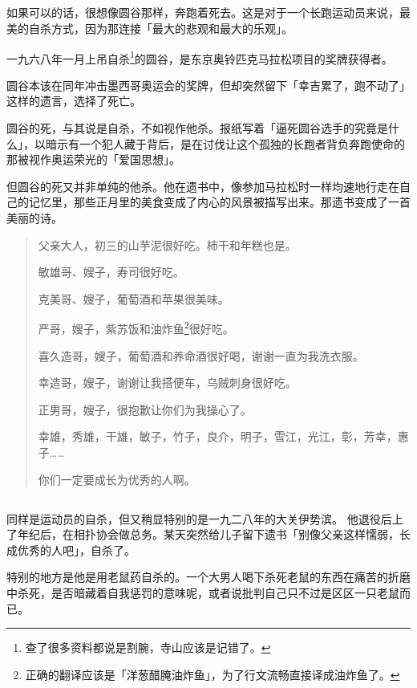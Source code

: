 \documentclass[UTF8]{ctexart}
\begin{document}
\subsection{}

如果可以的话，很想像圆谷那样，奔跑着死去。这是对于一个长跑运动员来说，最美的自杀方式，因为那连接「最大的悲观和最大的乐观」。

一九六八年一月上吊自杀\footnote{查了很多资料都说是割腕，寺山应该是记错了。}的圆谷，是东京奥铃匹克马拉松项目的奖牌获得者。

圆谷本该在同年冲击墨西哥奥运会的奖牌，但却突然留下「幸吉累了，跑不动了」这样的遗言，选择了死亡。

圆谷的死，与其说是自杀，不如视作他杀。报纸写着「逼死圆谷选手的究竟是什么」，以暗示有一个犯人藏于背后，是在讨伐让这个孤独的长跑者背负奔跑使命的那被视作奥运荣光的「爱国思想」。

但圆谷的死又并非单纯的他杀。他在遗书中，像参加马拉松时一样均速地行走在自己的记忆里，那些正月里的美食变成了内心的风景被描写出来。那遗书变成了一首美丽的诗。

\begin{verse}
父亲大人，初三的山芋泥很好吃。柿干和年糕也是。

敏雄哥、嫂子，寿司很好吃。

克美哥、嫂子，葡萄酒和苹果很美味。

严哥，嫂子，紫苏饭和油炸鱼\footnote{正确的翻译应该是「洋葱醋腌油炸鱼」，为了行文流畅直接译成油炸鱼了。}很好吃。

喜久造哥，嫂子，葡萄酒和养命酒很好喝，谢谢一直为我洗衣服。

幸造哥，嫂子，谢谢让我搭便车，乌贼刺身很好吃。

正男哥，嫂子，很抱歉让你们为我操心了。

幸雄，秀雄，干雄，敏子，竹子，良介，明子，雪江，光江，彰，芳幸，惠子……

你们一定要成长为优秀的人啊。
\end{verse}

\subsection{}

同样是运动员的自杀，但又稍显特别的是一九二八年的大关伊势滨。
他退役后上了年纪后，在相扑协会做总务。某天突然给儿子留下遗书「别像父亲这样懦弱，长成优秀的人吧」，自杀了。

特别的地方是他是用老鼠药自杀的。一个大男人喝下杀死老鼠的东西在痛苦的折磨中杀死，是否暗藏着自我惩罚的意味呢，或者说批判自己只不过是区区一只老鼠而已。
\end{document}
